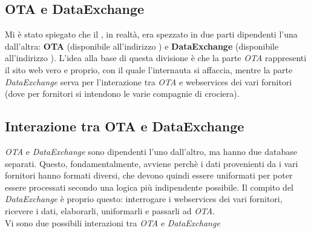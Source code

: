 \subsection{OTA e DataExchange}
Mi è stato spiegato che il \bookingEngine, in realtà, era spezzato in due parti dipendenti l'una dall'altra: \textbf{OTA} (disponibile all'indirizzo \cite{site:crociereregalo}) e \textbf{DataExchange} (disponibile all'indirizzo \cite{site:dataexchange}). L'idea alla base di questa divisione è che la parte \textit{OTA} rappresenti il sito web vero e proprio, con il quale l'internauta si affaccia, mentre la parte \textit{DataExchange} serva per l'interazione tra \textit{OTA} e \glspl{webservice} dei vari fornitori (dove per fornitori si intendono le varie compagnie di crociera). 

\subsection{Interazione tra OTA e DataExchange}
\textit{OTA} e \textit{DataExchange} sono dipendenti l'uno dall'altro, ma hanno due database separati. Questo, fondamentalmente, avviene perchè i dati provenienti da i vari fornitori hanno formati diversi, che devono quindi essere uniformati per poter essere processati secondo una logica più indipendente possibile. Il compito del \textit{DataExchange} è proprio questo: interrogare i \glspl{webservice} dei vari fornitori, ricevere i dati, elaborarli, uniformarli e passarli ad \textit{OTA}.\\
Vi sono due possibili interazioni tra \textit{OTA} e \textit{DataExchange}
